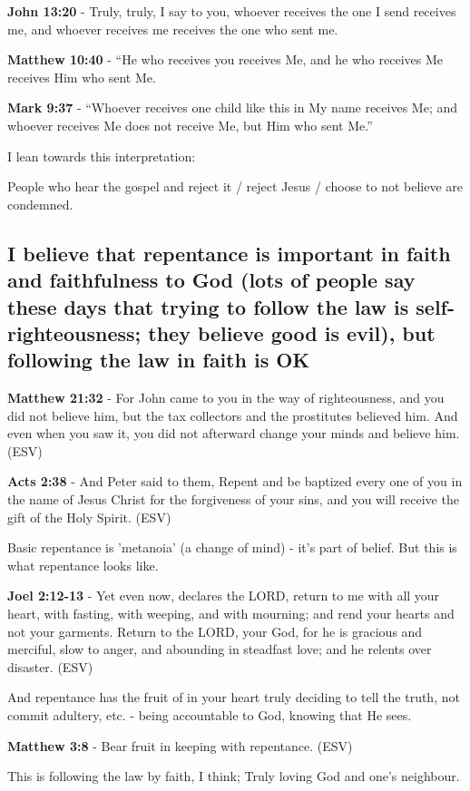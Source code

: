 \documentclass[11pt]{article}
\begin{document}
\textbf{John 13:20} - Truly, truly, I say to you, whoever receives the one I send receives me, and whoever receives me receives the one who sent me.

\textbf{Matthew 10:40} - “He who receives you receives Me, and he who receives Me receives Him who sent Me.

\textbf{Mark 9:37} - “Whoever receives one child like this in My name receives Me; and whoever receives Me does not receive Me, but Him who sent Me.”

I lean towards this interpretation:

People who hear the gospel and reject it / reject Jesus / choose to not believe are condemned.

\subsection{I believe that repentance is important in faith and faithfulness to God (lots of people say these days that trying to follow the law is self-righteousness; they believe good is evil), but following the law in faith is OK}
\label{sec:org1f9e4f3}

\textbf{Matthew 21:32} - For John came to you in the way of righteousness, and you did not believe him, but the tax collectors and the prostitutes believed him. And even when you saw it, you did not afterward change your minds and believe him. (ESV)

\textbf{Acts 2:38} - And Peter said to them, Repent and be baptized every one of you in the name of Jesus Christ for the forgiveness of your sins, and you will receive the gift of the Holy Spirit. (ESV)

Basic repentance is 'metanoia' (a change of mind) - it's part of belief.
But this is what repentance looks like.

\textbf{Joel 2:12-13} - Yet even now, declares the LORD, return to me with all your heart, with fasting, with weeping, and with mourning; and rend your hearts and not your garments. Return to the LORD, your God, for he is gracious and merciful, slow to anger, and abounding in steadfast love; and he relents over disaster. (ESV)

And repentance has the fruit of in your heart truly deciding to tell the truth, not commit adultery, etc. - being accountable to God, knowing that He sees.

\textbf{Matthew 3:8} - Bear fruit in keeping with repentance.  (ESV)

This is following the law by faith, I think; Truly loving God and one's neighbour.
\end{document}
